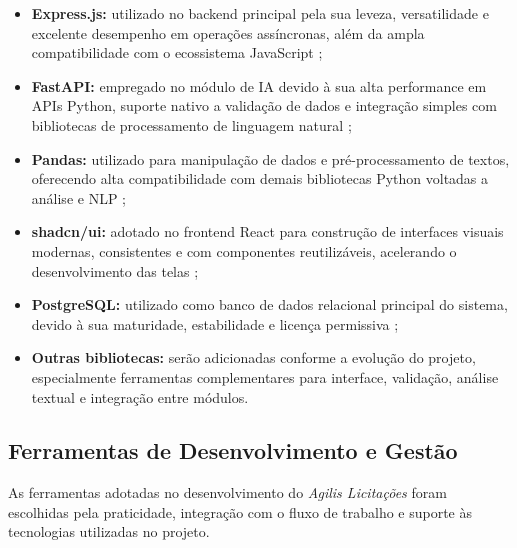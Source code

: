 \begin{itemize}
    \item \textbf{Express.js:} utilizado no backend principal pela sua leveza, versatilidade e excelente desempenho em operações assíncronas, além da ampla compatibilidade com o ecossistema JavaScript \cite{nodejs_docs_2024};
    
    \item \textbf{FastAPI:} empregado no módulo de IA devido à sua alta performance em APIs Python, suporte nativo a validação de dados e integração simples com bibliotecas de processamento de linguagem natural \cite{fastapi_docs_2024};
    
    \item \textbf{Pandas:} utilizado para manipulação de dados e pré-processamento de textos, oferecendo alta compatibilidade com demais bibliotecas Python voltadas a análise e NLP \cite{pandas_docs_2024};
    
    \item \textbf{shadcn/ui:} adotado no frontend React para construção de interfaces visuais modernas, consistentes e com componentes reutilizáveis, acelerando o desenvolvimento das telas \cite{shadcn_docs_2024};
    
    \item \textbf{PostgreSQL:} utilizado como banco de dados relacional principal do sistema, devido à sua maturidade, estabilidade e licença permissiva \cite{postgresql_docs_2024};
    
    \item \textbf{Outras bibliotecas:} serão adicionadas conforme a evolução do projeto, especialmente ferramentas complementares para interface, validação, análise textual e integração entre módulos.
\end{itemize}


\subsection{Ferramentas de Desenvolvimento e Gestão}

As ferramentas adotadas no desenvolvimento do \textit{Agilis Licitações} foram escolhidas pela praticidade, integração com o fluxo de trabalho e suporte às tecnologias utilizadas no projeto.

